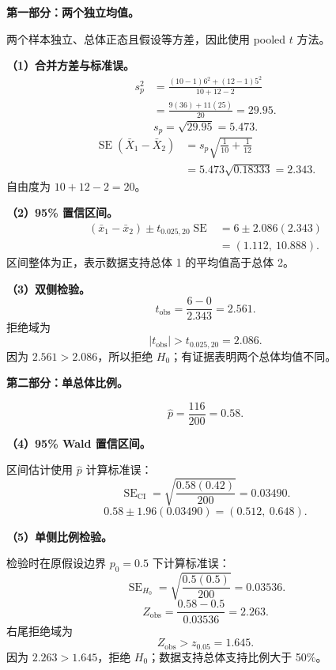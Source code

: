 \documentclass[11pt,a4paper]{article}
\newcommand{\SE}{\operatorname{SE}}
\begin{document}
\begin{solutionbox}
\textbf{第一部分：两个独立均值。}

两个样本独立、总体正态且假设等方差，因此使用 pooled $t$ 方法。

\textbf{（1）合并方差与标准误。}
\[
\begin{aligned}
  s_p^2
  &=
  \frac{(10-1)6^2+(12-1)5^2}{10+12-2}\\
  &=
  \frac{9(36)+11(25)}{20}
  =
  \boxed{29.95}.
\end{aligned}
\]
\[
  s_p=\sqrt{29.95}=\boxed{5.473}.
\]
\[
\begin{aligned}
  \SE(\bar X_1-\bar X_2)
  &=
  s_p\sqrt{\frac1{10}+\frac1{12}}\\
  &=
  5.473\sqrt{0.18333}
  =
  \boxed{2.343}.
\end{aligned}
\]
自由度为 $10+12-2=20$。

\textbf{（2）95\% 置信区间。}
\[
\begin{aligned}
  (\bar x_1-\bar x_2)
  \pm
  t_{0.025,20}\SE
  &=
  6\pm2.086(2.343)\\
  &=
  \boxed{(1.112,\ 10.888)}.
\end{aligned}
\]
区间整体为正，表示数据支持总体 1 的平均值高于总体 2。

\textbf{（3）双侧检验。}
\[
  t_{\mathrm{obs}}
  =
  \frac{6-0}{2.343}
  =
  2.561.
\]
拒绝域为
\[
  |t_{\mathrm{obs}}|>t_{0.025,20}=2.086.
\]
因为 $2.561>2.086$，所以拒绝 $H_0$；有证据表明两个总体均值不同。

\textbf{第二部分：单总体比例。}

\[
  \hat p=\frac{116}{200}=0.58.
\]

\textbf{（4）95\% Wald 置信区间。}

区间估计使用 $\hat p$ 计算标准误：
\[
  \SE_{\mathrm{CI}}
  =
  \sqrt{\frac{0.58(0.42)}{200}}
  =
  0.03490.
\]
\[
  0.58\pm1.96(0.03490)
  =
  \boxed{(0.512,\ 0.648)}.
\]

\textbf{（5）单侧比例检验。}

检验时在原假设边界 $p_0=0.5$ 下计算标准误：
\[
  \SE_{H_0}
  =
  \sqrt{\frac{0.5(0.5)}{200}}
  =
  0.03536.
\]
\[
  Z_{\mathrm{obs}}
  =
  \frac{0.58-0.5}{0.03536}
  =
  2.263.
\]
右尾拒绝域为
\[
  Z_{\mathrm{obs}}>z_{0.05}=1.645.
\]
因为 $2.263>1.645$，拒绝 $H_0$；数据支持总体支持比例大于 50\%。
\end{solutionbox}
\end{document}
